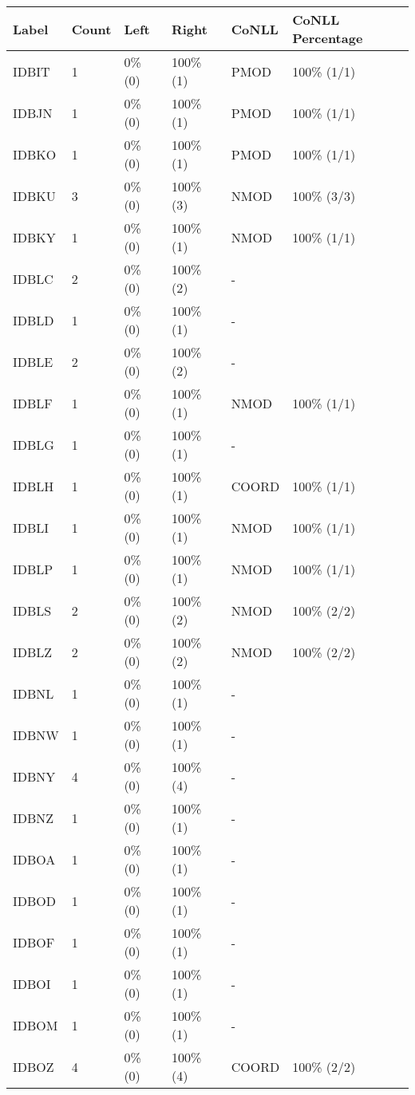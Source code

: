 \begin{figure*}
\begin{tabular}{|l|l|l|l||l|l|}
\hline
Label & Count & Left & Right & CoNLL & CoNLL Percentage\\ 
\hline
 IDBIT & 1 & 0\% (0) & 100\% (1) & PMOD & 100\% (1/1) \\ 
\hline
 IDBJN & 1 & 0\% (0) & 100\% (1) & PMOD & 100\% (1/1) \\ 
\hline
 IDBKO & 1 & 0\% (0) & 100\% (1) & PMOD & 100\% (1/1) \\ 
\hline
 IDBKU & 3 & 0\% (0) & 100\% (3) & NMOD & 100\% (3/3) \\ 
\hline
 IDBKY & 1 & 0\% (0) & 100\% (1) & NMOD & 100\% (1/1) \\ 
\hline
 IDBLC & 2 & 0\% (0) & 100\% (2) & - &  \\ 
\hline
 IDBLD & 1 & 0\% (0) & 100\% (1) & - &  \\ 
\hline
 IDBLE & 2 & 0\% (0) & 100\% (2) & - &  \\ 
\hline
 IDBLF & 1 & 0\% (0) & 100\% (1) & NMOD & 100\% (1/1) \\ 
\hline
 IDBLG & 1 & 0\% (0) & 100\% (1) & - &  \\ 
\hline
 IDBLH & 1 & 0\% (0) & 100\% (1) & COORD & 100\% (1/1) \\ 
\hline
 IDBLI & 1 & 0\% (0) & 100\% (1) & NMOD & 100\% (1/1) \\ 
\hline
 IDBLP & 1 & 0\% (0) & 100\% (1) & NMOD & 100\% (1/1) \\ 
\hline
 IDBLS & 2 & 0\% (0) & 100\% (2) & NMOD & 100\% (2/2) \\ 
\hline
 IDBLZ & 2 & 0\% (0) & 100\% (2) & NMOD & 100\% (2/2) \\ 
\hline
 IDBNL & 1 & 0\% (0) & 100\% (1) & - &  \\ 
\hline
 IDBNW & 1 & 0\% (0) & 100\% (1) & - &  \\ 
\hline
 IDBNY & 4 & 0\% (0) & 100\% (4) & - &  \\ 
\hline
 IDBNZ & 1 & 0\% (0) & 100\% (1) & - &  \\ 
\hline
 IDBOA & 1 & 0\% (0) & 100\% (1) & - &  \\ 
\hline
 IDBOD & 1 & 0\% (0) & 100\% (1) & - &  \\ 
\hline
 IDBOF & 1 & 0\% (0) & 100\% (1) & - &  \\ 
\hline
 IDBOI & 1 & 0\% (0) & 100\% (1) & - &  \\ 
\hline
 IDBOM & 1 & 0\% (0) & 100\% (1) & - &  \\ 
\hline
 IDBOZ & 4 & 0\% (0) & 100\% (4) & COORD & 100\% (2/2) \\ 

\end{tabular}
\end{figure*}
